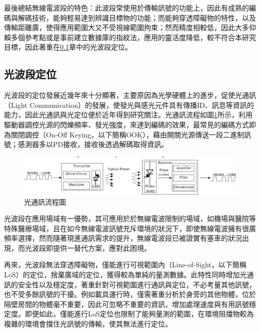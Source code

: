         最後總結無線電波段的特色：此波段常使用於傳輸訊號的功能上，因此有成熟的編碼與解碼技術，能夠輕易達到辨識目標物的功能；而能夠穿透障礙物的特性，以及傳輸距離廣，使得應用範圍大又不受視線範圍拘束；然而精度相較低，因此大多仰賴多個參考點或是事前建立數據庫的指紋法，應用的靈活度降低，較不符合本研究目標，因此著重在\ref{chp:light}章中的光波段定位。

       



       


        \subsection{光波段定位}
        \label{chp:light}
            
            光波段的定位發展近幾年來十分顯著，主要原因為光學硬體上的進步，促使光通訊（Light Communication）的發展，使發光與感光元件具有傳播ID、訊息等資訊的能力，因此光通訊與光定位便於近年得到研究關注\cite{survey_light2018}。光通訊流程如圖\ref{pic:vlc_flow}所示，利用驅動器調控光源的閃爍頻率、發光強度，來達到編碼的效果，最常見的編碼方式即為關閉調控（On-Off Keying，以下簡稱OOK），藉由開關光源傳送一段二進制訊號；感測器多以PD接收，接收後透過解碼取得資訊\cite{pic:vlc}。
            \begin{figure}[htpb]
                \centering
                \includegraphics[width=15cm]{ch2pic/vlc_flow.png}
                \caption{光通訊流程圖\cite{pic:vlc}}
                \label{pic:vlc_flow}
            \end{figure}

            光波段在應用場域有一優勢，其可應用於於無線電波限制的場域，如機場與醫院等特殊醫療場域\cite{case:vlc_mobile}，且在如今無線電波訊號充斥環境的狀況下，即使無線電波擁有很廣頻率選擇，然而隨著現進通訊需求的提升，無線電波段已被證實有塞車的狀況出現，而光波段即提供一替代方案，應對此困境。
            
            
            再來，光波段無法穿透障礙物，僅能進行可視範圍內（Line-of-Sight，以下簡稱LoS）的定位，捨棄廣域的定位，獲得較為單純的量測數據。此特性同時增加光通訊的安全性以及穩定度，著重針對可視範圍進行通訊與定位，不必考量其他訊號，也不受多餘訊號的干擾\cite{vlc_adv}。例如載具運行時，僅需著重分析於身旁的其他物體，位於隔壁房間的物體毫不重要，因此可忽略不重要的資訊，增加處理速度與有用訊號穩定度。即便如此，僅能進行LoS定位也限制了能夠量測的範圍，在環境阻擋物較為複雜的環境會擋住光訊號的傳輸，使其無法進行定位。


